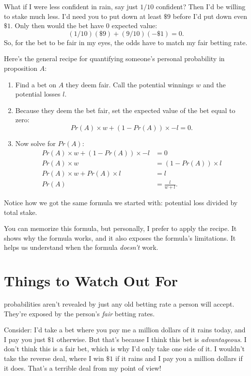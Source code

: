 \documentclass[justified]{tufte-book}
\providecommand{\tightlist}{%
  \setlength{\itemsep}{0pt}\setlength{\parskip}{0pt}}
\newcommand{\p}{Pr}
\theoremstyle{definition}
\theoremstyle{definition}
\theoremstyle{definition}
\theoremstyle{remark}
\begin{document}
What if I were less confident in rain, say just \(1/10\) confident? Then I'd be willing to stake much less. I'd need you to put down at least \(\$9\) before I'd put down even \(\$1\). Only then would the bet have \(0\) expected value:
\[ (1/10)(\$9) + (9/10)(-\$1) = 0. \]
So, for the bet to be fair in my eyes, the odds have to match my fair betting rate.

Here's the general recipe for quantifying someone's personal probability in proposition \(A\):

\begin{enumerate}
\def\labelenumi{\arabic{enumi}.}
\tightlist
\item
  Find a bet on \(A\) they deem fair. Call the potential winnings \(w\) and the potential losses \(l\).
\item
  Because they deem the bet fair, set the expected value of the bet equal to zero:
  \[ \p(A) \times w + (1-\p(A)) \times -l = 0. \]
\item
  Now solve for \(\p(A)\):
  \[
     \begin{aligned}
       \p(A) \times w + (1-\p(A)) \times -l &= 0 \\
                             \p(A) \times w &= (1-\p(A)) \times l \\
            \p(A) \times w + \p(A) \times l &= l \\
                                      \p(A) &= \frac{l}{w + l}.
     \end{aligned}
   \]
\end{enumerate}

Notice how we got the same formula we started with: potential loss divided by total stake.

You can memorize this formula, but personally, I prefer to apply the recipe. It shows why the formula works, and it also exposes the formula's limitations. It helps us understand when the formula \emph{doesn't} work.

\hypertarget{things-to-watch-out-for}{%
\section{Things to Watch Out For}\label{things-to-watch-out-for}}

 probabilities aren't revealed by just any old betting rate a person will accept. They're exposed by the person's \emph{fair} betting rates.

Consider: I'd take a bet where you pay me a million dollars of it rains today, and I pay you just \(\$1\) otherwise. But that's because I think this bet is \emph{advantageous}. I don't think this is a fair bet, which is why I'd only take one side of it. I wouldn't take the reverse deal, where I win \(\$1\) if it rains and I pay you a million dollars if it does. That's a terrible deal from my point of view!
\end{document}
